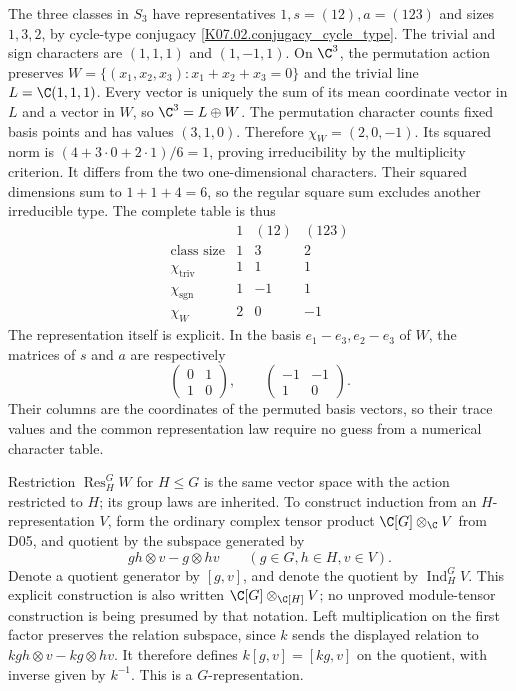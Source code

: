 The three classes in $S_3$ have representatives $1,s=(12),a=(123)$
and sizes $1,3,2$, by cycle-type conjugacy
\ref{K07.02.conjugacy_cycle_type}. The trivial and sign characters
are $(1,1,1)$ and $(1,-1,1)$. On $\C^3$, the permutation action
preserves $W=\{(x_1,x_2,x_3):x_1+x_2+x_3=0\}$ and the trivial
line $L=\C(1,1,1)$. Every vector is uniquely the sum of its mean
coordinate vector in $L$ and a vector in $W$, so
$\C^3=L\oplus W$. The permutation character counts fixed basis
points and has values $(3,1,0)$. Therefore $\chi_W=(2,0,-1)$.
Its squared norm is $(4+3\cdot0+2\cdot1)/6=1$, proving
irreducibility by the multiplicity criterion. It differs from the two
one-dimensional characters. Their squared dimensions sum to
$1+1+4=6$, so the regular square sum excludes another irreducible type.
The complete table is thus
\[
\begin{array}{c|rrr}
 &1&(12)&(123)\\ \hline
\text{class size}&1&3&2\\
\chi_{\mathrm{triv}}&1&1&1\\
\chi_{\mathrm{sgn}}&1&-1&1\\
\chi_W&2&0&-1
\end{array}
\]
The representation itself is explicit. In the basis $e_1-e_3,e_2-e_3$
of $W$, the matrices of $s$ and $a$ are respectively
\[
 \begin{pmatrix}0&1\\1&0\end{pmatrix},\qquad
 \begin{pmatrix}-1&-1\\1&0\end{pmatrix}.
\]
Their columns are the coordinates of the permuted basis vectors, so
their trace values and the common representation law require no
guess from a numerical character table.

Restriction $\operatorname{Res}_H^G W$ for $H\leq G$ is the same
vector space with the action restricted to $H$; its group laws are
inherited. To construct induction from an $H$-representation $V$, form
the ordinary complex tensor product $\C[G]\otimes_\C V$ from D05,
and quotient by the subspace generated by
\[
 gh\otimes v-g\otimes hv\qquad(g\in G,h\in H,v\in V).
\]
Denote a quotient generator by $[g,v]$, and denote the quotient by
$\operatorname{Ind}_H^G V$. This explicit construction is also written
$\C[G]\otimes_{\C[H]}V$; no unproved module-tensor construction is
being presumed by that notation. Left multiplication on the first
factor preserves the relation subspace, since $k$ sends the displayed
relation to $kgh\otimes v-kg\otimes hv$. It therefore defines
$k[g,v]=[kg,v]$ on the quotient, with inverse given by $k^{-1}$.
This is a $G$-representation.


